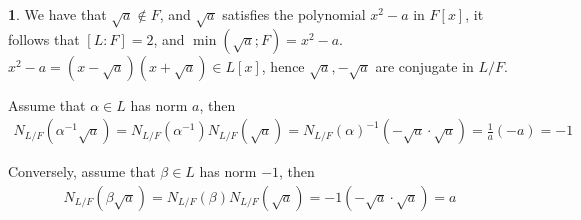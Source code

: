 \documentclass[11pt]{article}
\theoremstyle{definition}
\newtheorem{pb}{}
\begin{document}
    \begin{pb}
        We have that \(\sqrt{a} \not \in F\), and \(\sqrt{a}\) satisfies the polynomial \(x^2 - a\) in \(F[x]\), it follows that \([L:F] = 2\), and \(\min(\sqrt{a};F) = x^2 - a\).
        \(x^2 -a = (x-\sqrt{a})(x+\sqrt{a}) \in L[x]\), hence \(\sqrt{a}, -\sqrt{a}\) are conjugate in \(L/F\).

        Assume that \(\alpha \in L\) has norm \(a\), then 
        \begin{align*}
            N_{L/F}(\alpha^{-1} \sqrt{a}) = N_{L/F}(\alpha^{-1})N_{L/F}(\sqrt{a}) = N_{L/F}(\alpha)^{-1}(-\sqrt{a}\cdot\sqrt{a}) = \frac{1}{a}(-a) = -1
        \end{align*}

        Conversely, assume that \(\beta \in L\) has norm \(-1\), then
        \begin{align*}
            N_{L/F}(\beta \sqrt{a}) = N_{L/F}(\beta)N_{L/F}(\sqrt{a}) = -1(-\sqrt{a}\cdot\sqrt{a}) = a
        \end{align*}
    \end{pb}
\end{document}
